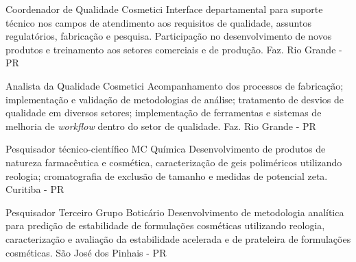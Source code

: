 {Coordenador de Qualidade}
{Cosmetici}
{
Interface departamental para suporte técnico nos campos de
atendimento aos requisitos de qualidade,
assuntos regulatórios, fabricação e pesquisa.
Participação no desenvolvimento de novos 
produtos e treinamento aos setores comerciais e de produção.
}
{Faz. Rio Grande - PR}

{Analista da Qualidade}
{Cosmetici}
{
    Acompanhamento dos processos de fabricação;
    implementação e validação de metodologias de análise;
    tratamento de desvios de qualidade em diversos setores;
    implementação de ferramentas e sistemas de melhoria de \emph{workflow} 
    dentro do setor de qualidade.
}
{Faz. Rio Grande - PR}






{Pesquisador técnico-científico}
{MC Química}
{
    Desenvolvimento de produtos de natureza farmacêutica e cosmética, 
    caracterização de geis poliméricos utilizando reologia;
    cromatografia de exclusão de tamanho e medidas de potencial zeta.
}
{Curitiba - PR}

{Pesquisador Terceiro}
{Grupo Boticário}
{
Desenvolvimento de metodologia analítica para predição de estabilidade
de formulações cosméticas utilizando reologia,
caracterização e avaliação da estabilidade acelerada e de prateleira
de formulações cosméticas.
}
{São José dos Pinhais - PR}

